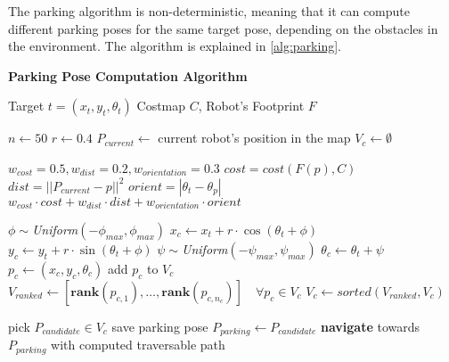 The parking algorithm is non-deterministic, meaning that it can compute different parking poses for the same target
pose, depending on the obstacles in the environment. The algorithm is explained in \ref{alg:parking}.

\begin{algorithm}[H]
    \caption{\textbf{Parking Pose Computation Algorithm}}
    \label{alg:parking}
    \begin{algorithmic}[1]
    \Require Target $t = (x_t, y_t, \theta_t)$
    \Require Costmap $C$, Robot's Footprint $F$

    \State $n \gets 50$ 
    \State $r \gets 0.4$ 
    \State $P_{current} \gets$ current robot's position in the map
    \State $V_c \gets \emptyset$  

        \State $w_{cost} = 0.5, w_{dist} = 0.2, w_{orientation} = 0.3$ 
        \State $cost = cost(F(p), C)$ 
        \State $dist = ||P_{current} - p|| ^2$ 
        \State $orient = | \theta_t - \theta_p |$ 
        \State \Return $w_{cost} \cdot cost + w_{dist} \cdot dist + w_{orientation} \cdot orient$
    \EndFunction

        \State $\phi \sim $\textit{Uniform}$(-\phi_{max}, \phi_{max})$ 
        \State $x_c \gets x_t + r \cdot \cos(\theta_t + \phi)$ 
        \State $y_c \gets y_t + r \cdot \sin(\theta_t + \phi)$ 
        \State $\psi \sim $\textit{Uniform}$(-\psi_{max}, \psi_{max})$ 
        \State $\theta_c \gets \theta_t + \psi$ 
        \State $p_c \gets (x_c, y_c, \theta_c)$ 
        \State {}
            \State add $p_c$ to $V_c$
        \EndIf
    \EndFor
    \State $V_{ranked} \gets \left[\textbf{rank}(p_{c,1}), \ldots, \textbf{rank}(p_{c, n_c})\right] 
        \quad \forall p_c \in V_c $
    \State $V_{c} \gets \textit{sorted}(V_{ranked}, V_c) $ 

    \Repeat 
        \State pick {$P_{candidate} \in V_c$} 
            \State save parking pose $P_{parking} \gets P_{candidate}$
        \EndIf
        \State \textbf{navigate} towards $P_{parking}$ with computed traversable path
    \EndIf
    \end{algorithmic}
\end{algorithm}

